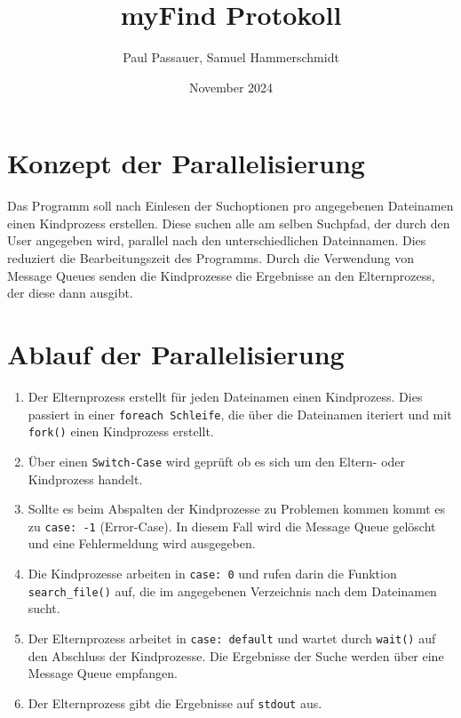 \documentclass{article}
\title{myFind Protokoll}
\author{Paul Passauer, Samuel Hammerschmidt}
\date{November 2024}
\begin{document}
\maketitle

\section*{Konzept der Parallelisierung}
Das Programm soll nach Einlesen der Suchoptionen pro angegebenen Dateinamen einen Kindprozess erstellen. Diese suchen alle am selben Suchpfad, der durch den User angegeben wird, parallel nach den unterschiedlichen Dateinnamen.
Dies reduziert die Bearbeitungszeit des Programms. Durch die Verwendung von Message Queues senden die Kindprozesse die Ergebnisse an den Elternprozess, der diese dann ausgibt.

\section*{Ablauf der Parallelisierung}
\begin{enumerate}
    \item Der Elternprozess erstellt für jeden Dateinamen einen Kindprozess. Dies passiert in einer \texttt{foreach Schleife}, die über die Dateinamen iteriert und mit \texttt{fork()} einen Kindprozess erstellt.
    \item Über einen \texttt{Switch-Case} wird geprüft ob es sich um den Eltern- oder Kindprozess handelt.
    \item Sollte es beim Abspalten der Kindprozesse zu Problemen kommen kommt es zu \texttt{case: -1} (Error-Case). In diesem Fall wird die Message Queue gelöscht und eine Fehlermeldung wird ausgegeben.
    \item Die Kindprozesse arbeiten in \texttt{case: 0} und rufen darin die Funktion \texttt{search\_file()} auf, die im angegebenen Verzeichnis nach dem Dateinamen sucht.
    \item Der Elternprozess arbeitet in \texttt{case: default} und wartet durch \texttt{wait()} auf den Abschluss der Kindprozesse. Die Ergebnisse der Suche werden über eine Message Queue empfangen.
    \item Der Elternprozess gibt die Ergebnisse auf \texttt{stdout} aus.
\end{enumerate}
\end{document}
